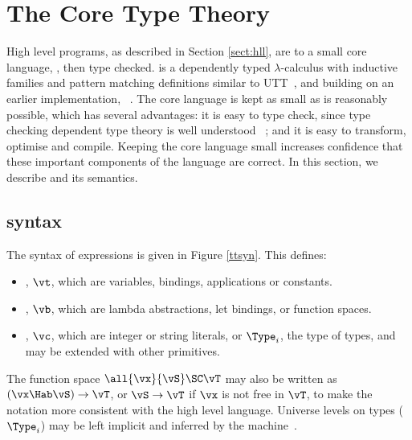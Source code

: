 \section{The Core Type Theory}

\label{sect:typechecking}

High level \Idris{} programs, as described in Section \ref{sect:hll}, are 
 to a small core language, \TT{}, then type checked. 
\TT{} is a dependently typed $\lambda$-calculus with inductive families
and pattern matching definitions similar to UTT~\cite{luo1994}, and building
on an earlier implementation, \Ivor{}~\cite{Brady2006b}.
The
core language is kept as small as is reasonably possible, which has several advantages: it is
easy to type check, since type checking dependent type theory is well understood
~\cite{loh2010tutorial}; and it is easy to transform, optimise and compile. Keeping
the core language small increases confidence that these important components of
the language are correct. In this section, we describe \TT{} and
its semantics.

\subsection{\TT{} syntax}

The syntax of \TT{} expressions is given in Figure \ref{ttsyn}. This defines:

\begin{itemize}
\item {}, $\vt$, which are variables, bindings, applications or constants.
\item {}, $\vb$, which are lambda abstractions, let bindings, or function spaces.
\item {}, $\vc$, which are integer or string literals, or $\Type_i$, the
type of types, and may be extended with other primitives. 
\end{itemize}

The function space $\all{\vx}{\vS}\SC\vT$ may also be written as $(\vx\Hab\vS)\to\vT$,
or $\vS\to\vT$ if $\vx$ is not free in $\vT$, to make the notation more consistent with
the high level language. Universe levels on types ($\Type_i$) may be left implicit and
inferred by the machine~\cite{pollack1990implicit}.

